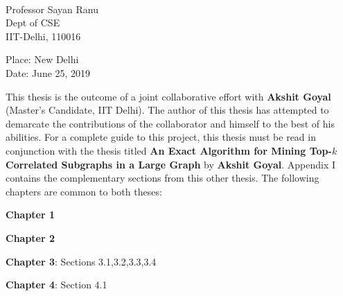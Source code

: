 \documentclass[MTech]{iitddiss}
\begin{document}
\vspace*{1.5in}

\begin{singlespacing}
\hspace*{-0.25in}
\parbox{2.5in}{
 \\
\noindent Professor Sayan Ranu\\
\noindent Dept of CSE\\
\noindent IIT-Delhi, 110016 \\
}
\hspace*{1.0in}
\end{singlespacing}
\vspace*{0.25in}
\noindent \hfill Place: New Delhi\\
\noindent \hfill Date: June 25, 2019\\


\acknowledgements

This thesis is the outcome of a joint collaborative effort with \textbf{Akshit Goyal}
(Master's Candidate, IIT Delhi). The author of this thesis has attempted to
demarcate the contributions of the collaborator and himself to the best of his
abilities. For a complete guide to this project, this thesis must be read in
conjunction with the thesis titled \textbf{An Exact Algorithm for Mining Top-$k$
Correlated Subgraphs in a Large Graph} by \textbf{Akshit Goyal}. Appendix I contains
the complementary sections from this other thesis. The following chapters are
common to both theses:

\textbf{Chapter 1}

\textbf{Chapter 2}

\textbf{Chapter 3}: Sections 3.1,3.2,3.3,3.4

\textbf{Chapter 4}: Section 4.1
\end{document}

